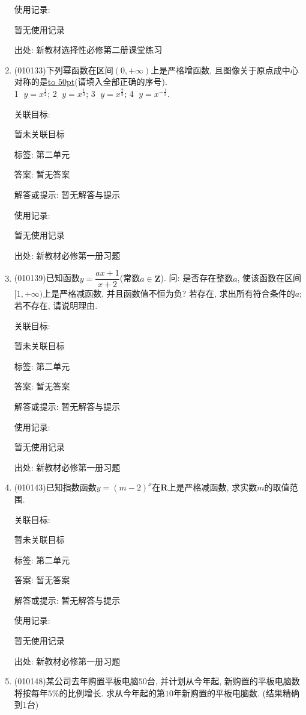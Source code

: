 \documentclass[10pt,a4paper]{article}
\newcommand{\blank}[1]{\underline{\hbox to #1pt{}}}
\begin{document}
\begin{enumerate}[1.]
使用记录:

暂无使用记录


出处: 新教材选择性必修第二册课堂练习
\item { (010133)}下列幂函数在区间$(0, +\infty)$上是严格增函数, 且图像关于原点成中心对称的是\blank{50}(请填入全部正确的序号).\\
\textcircled{1} $y=x^\frac 12$; \textcircled{2} $y=x^\frac 13$; \textcircled{3} $y=x^\frac 23$; \textcircled{4} $y=x^{-\frac 13}$.


关联目标:

暂未关联目标



标签: 第二单元

答案: 暂无答案

解答或提示: 暂无解答与提示

使用记录:

暂无使用记录


出处: 新教材必修第一册习题
\item { (010139)}已知函数$y=\dfrac{ax+1}{x+2}$(常数$a\in \mathbf{Z}$). 问: 是否存在整数$a$, 使该函数在区间$[1, +\infty)$上是严格减函数, 并且函数值不恒为负?  若存在, 求出所有符合条件的$a$; 若不存在, 请说明理由.


关联目标:

暂未关联目标



标签: 第二单元

答案: 暂无答案

解答或提示: 暂无解答与提示

使用记录:

暂无使用记录


出处: 新教材必修第一册习题
\item { (010143)}已知指数函数$y=(m-2)^x$在$\mathbf{R}$上是严格减函数, 求实数$m$的取值范围.


关联目标:

暂未关联目标



标签: 第二单元

答案: 暂无答案

解答或提示: 暂无解答与提示

使用记录:

暂无使用记录


出处: 新教材必修第一册习题
\item { (010148)}某公司去年购置平板电脑$50$台, 并计划从今年起, 新购置的平板电脑数将按每年$5\%$的比例增长. 求从今年起的第$10$年新购置的平板电脑数. (结果精确到$1$台)



\end{enumerate}
\end{document}
